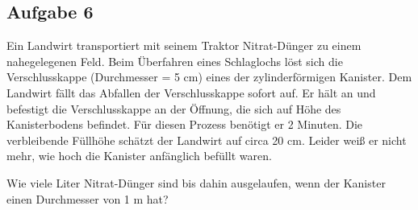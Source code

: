 \documentclass[a4paper,11pt]{article}
\newif\ifshowme
\begin{document}
\begin{marginfigure}[+2cm]



\ifshowme
\antwort{

Kritische Reynoldszahl für turbulente oder laminare Strömung:
\begin{equation}
\text{Re}_{\text{krit}} = \frac{\rho \cdot d \cdot v}{\eta} = 2.300
\end{equation}


Einsetzen:
\begin{align*}
&\text{a)} && \frac{1.000\mskip3mu \kg/\m^3 \cdot 0,3\mskip3mu \m \cdot 0,05\mskip3mu \m/\s}{1.790 \cdot 10^{-6}\mskip3mu \text{P} \cdot \s} &&\approx 8.379,9 \\
&\text{b)} && \frac{1.000\mskip3mu \kg/\m^3 \cdot 0,3\mskip3mu \m \cdot 0,01\mskip3mu \m/\s}{1.790 \cdot 10^{-6}\mskip3mu \text{P} \cdot \s} &&\approx 1.676 \\
&\text{c)} && \frac{1.000\mskip3mu \kg/\m^3 \cdot 0,1\mskip3mu \m \cdot 0,05\mskip3mu \m/\s}{1.790 \cdot 10^{-6}\mskip3mu \text{P} \cdot \s} &&\approx 2.793,3 \\
\end{align*}

Oberhalb der kritischen Reynolds-Zahl 2.300 erfolgt der Übergang zu turbulenten Strömungen.
}
\pagebreak
\else
\fi


\subsection*{Aufgabe 6}
Ein Landwirt transportiert mit seinem Traktor Nitrat-Dünger zu einem nahegelegenen Feld. Beim Überfahren eines Schlaglochs löst sich die Verschlusskappe (Durchmesser = 5 cm) eines der zylinderförmigen Kanister. Dem Landwirt fällt das Abfallen der Verschlusskappe sofort auf. Er hält an und befestigt die Verschlusskappe an der Öffnung, die sich auf Höhe des Kanisterbodens befindet. Für diesen Prozess benötigt er 2 Minuten. Die verbleibende Füllhöhe schätzt der Landwirt auf circa 20 cm. Leider weiß er nicht mehr, wie hoch die Kanister anfänglich befüllt waren.\par 
Wie viele Liter Nitrat-Dünger sind bis dahin ausgelaufen, wenn der Kanister einen Durchmesser von 1 m hat? 



\end{marginfigure}
\end{document}
